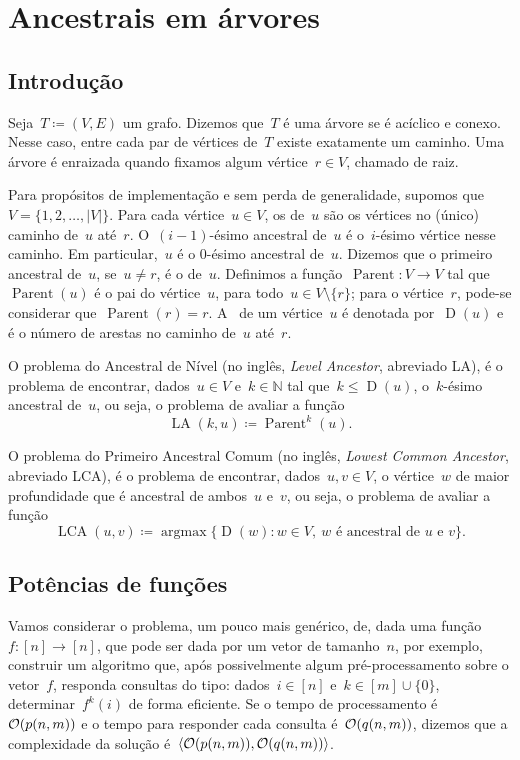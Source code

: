 \documentclass[main.tex]{subfiles}
\providecommand{\Par}{\operatorname{Parent}}
\newcommand{\LA}{\operatorname{LA}}
\newcommand{\Dep}{\operatorname{D}}
\newcommand{\LCA}{\operatorname{LCA}}
\newcommand{\argmax}{\operatorname{argmax}}
\begin{document}
\chapter{Ancestrais em árvores} \label{cap:ancestrais}

\section{Introdução}

Seja~$T \coloneqq (V, E)$ um grafo. Dizemos que~$T$ é uma árvore se é acíclico e conexo. Nesse caso, entre cada par de vértices de~$T$ existe exatamente um caminho. Uma árvore é enraizada quando fixamos algum vértice~${r \in V}$, chamado de raiz.

Para propósitos de implementação e sem perda de generalidade, supomos que~$V = \{1, 2, \ldots, |V|\}$.
Para cada vértice~${u \in V}$, os  de~$u$ são os vértices no (único) caminho de~$u$ até~$r$. O~\mbox{$(i-1)$-ésimo} ancestral de~$u$ é o~$i$-ésimo vértice nesse caminho. Em particular,~$u$ é o $0$-ésimo ancestral de~$u$. Dizemos que o primeiro ancestral de~$u$, se~$u \neq r$, é o  de~$u$. Definimos a função~${\Par: V \rightarrow V}$ tal que~$\Par(u)$ é o pai do vértice~$u$, para todo~$u \in V \setminus \{r\}$; para o vértice~$r$, pode-se considerar que~$\Par(r) = r$. A~ de um vértice~$u$ é denotada por~$\Dep(u)$ e é o número de arestas no caminho de~$u$ até~$r$.

O problema do Ancestral de Nível (no inglês, \textit{Level Ancestor}, abreviado LA), é o problema de encontrar, dados~$u \in V$ e~$k \in \mathbb{N}$ tal que~$k \leq \Dep(u)$, o~$k$-ésimo ancestral de~$u$, ou seja, o problema de avaliar a função
$$\LA(k, u) \coloneqq \Par^k(u). $$

O problema do Primeiro Ancestral Comum (no inglês, \textit{Lowest Common Ancestor}, abreviado LCA), é o problema de encontrar, dados~$u, v \in V$, o vértice~$w$ de maior profundidade que é ancestral de ambos~$u$ e~$v$, ou seja, o problema de avaliar a função
$$\LCA(u, v) \coloneqq \argmax\{\Dep(w) : w \in V,\ w \text{ é ancestral de $u$ e $v$}\}. $$

\section{Potências de funções} \label{sec:potfunc}

Vamos considerar o problema, um pouco mais genérico, de, dada uma função~$f : [n] \rightarrow [n]$, que pode ser dada por um vetor de tamanho~$n$, por exemplo, construir um algoritmo que, após possivelmente algum pré-processamento sobre o vetor~$f$, responda consultas do tipo: dados~$i \in [n]$ e~$k \in [m] \cup \{0\}$, determinar~$f^k(i)$ de forma eficiente. Se o tempo de processamento é~$\mathcal{O}(p(n, m))$ e o tempo para responder cada consulta é~$\mathcal{O}(q(n, m))$, dizemos que a complexidade da solução é~$\langle\mathcal{O}(p(n, m)), \mathcal{O}(q(n, m))\rangle$.
\end{document}
